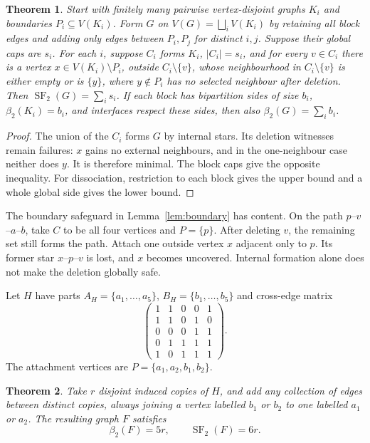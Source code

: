 \documentclass[11pt]{article}
\newtheorem{theorem}{Theorem}
\newcommand{\SF}{\operatorname{SF}_2}
\newcommand{\diss}{\beta_2}
\begin{document}
\begin{theorem}\label{thm:generalcomposition}
Start with finitely many pairwise vertex-disjoint graphs $K_i$ and
boundaries $P_i\subseteq V(K_i)$. Form $G$ on
$V(G)=\bigsqcup_i V(K_i)$ by retaining all block edges and adding only
edges between $P_i,P_j$ for distinct $i,j$. Suppose their global caps are $s_i$.
For each $i$, suppose $C_i$ forms $K_i$, $|C_i|=s_i$, and for every
$v\in C_i$ there is a vertex $x\in V(K_i)\setminus P_i$, outside $C_i\setminus\{v\}$,
whose neighbourhood in $C_i\setminus\{v\}$ is either empty or is
$\{y\}$, where $y\notin P_i$ has no selected neighbour after deletion.
Then $\SF(G)=\sum_i s_i$.
If each block has bipartition sides of size $b_i$, $\diss(K_i)=b_i$,
and interfaces respect these sides, then also $\diss(G)=\sum_i b_i$.
\end{theorem}
\begin{proof}
The union of the $C_i$ forms $G$ by internal stars. Its deletion
witnesses remain failures: $x$ gains no external neighbours, and in the
one-neighbour case neither does $y$. It is therefore minimal. The block
caps give the opposite inequality. For dissociation, restriction to each
block gives the upper bound and a whole global side gives the lower bound.
\end{proof}

The boundary safeguard in Lemma~\ref{lem:boundary} has content. On the
path $p$--$v$--$a$--$b$, take $C$ to be all four vertices and $P=\{p\}$.
After deleting $v$, the remaining set still forms the path. Attach one
outside vertex $x$ adjacent only to $p$. Its former star $x$--$p$--$v$
is lost, and $x$ becomes uncovered. Internal formation alone does not
make the deletion globally safe.


Let $H$ have parts $A_H=\{a_1,\ldots,a_5\}$,
$B_H=\{b_1,\ldots,b_5\}$ and cross-edge matrix
\begin{equation}\label{eq:matrix}
 \begin{pmatrix}
 1&1&0&0&1\\1&1&0&1&0\\0&0&0&1&1\\
 0&1&1&1&1\\1&0&1&1&1
 \end{pmatrix}.
\end{equation}
The attachment vertices are $P=\{a_1,a_2,b_1,b_2\}$.

\begin{theorem}\label{thm:composition}
Take $r$ disjoint induced copies of $H$, and add any collection of edges
between distinct copies, always joining a vertex labelled $b_1$ or $b_2$
to one labelled $a_1$ or $a_2$. The resulting graph $F$ satisfies
\[
 \diss(F)=5r,\qquad \SF(F)=6r.
\]
\end{theorem}
\end{document}
